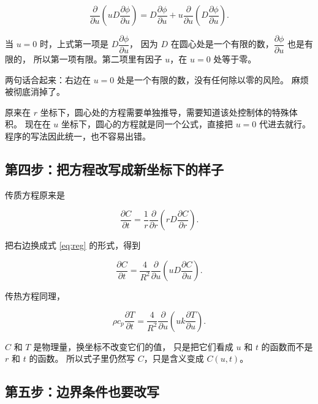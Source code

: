 \begin{equation}
\frac{\partial}{\partial u}\left(uD\frac{\partial\phi}{\partial u}\right)
= D\frac{\partial\phi}{\partial u} + u\frac{\partial}{\partial u}\left(D\frac{\partial\phi}{\partial u}\right).
\label{eq:expand-reg}
\end{equation}

当 $u=0$ 时，上式第一项是 $D\dfrac{\partial\phi}{\partial u}$，
因为 $D$ 在圆心处是一个有限的数，$\dfrac{\partial\phi}{\partial u}$ 也是有限的，
所以第一项有限。第二项里有因子 $u$，在 $u=0$ 处等于零。

两句话合起来：右边在 $u=0$ 处是一个有限的数，没有任何除以零的风险。
麻烦被彻底消掉了。

原来在 $r$ 坐标下，圆心处的方程需要单独推导，需要知道该处控制体的特殊体积。
现在在 $u$ 坐标下，圆心的方程就是同一个公式，直接把 $u=0$ 代进去就行。
程序的写法因此统一，也不容易出错。

\subsection{第四步：把方程改写成新坐标下的样子}

传质方程原来是

\begin{equation}
\frac{\partial C}{\partial t}=\frac{1}{r}\frac{\partial}{\partial r}\left(rD\frac{\partial C}{\partial r}\right).
\end{equation}

把右边换成式 \eqref{eq:reg} 的形式，得到

\begin{equation}
\boxed{\;
\frac{\partial C}{\partial t}=\frac{4}{R^2}\frac{\partial}{\partial u}\left(uD\frac{\partial C}{\partial u}\right).
\;}
\label{eq:mass-u}
\end{equation}

传热方程同理，

\begin{equation}
\boxed{\;
\rho c_p\frac{\partial T}{\partial t}=\frac{4}{R^2}\frac{\partial}{\partial u}\left(uk\frac{\partial T}{\partial u}\right).
\;}
\label{eq:energy-u}
\end{equation}

$C$ 和 $T$ 是物理量，换坐标不改变它们的值，
只是把它们看成 $u$ 和 $t$ 的函数而不是 $r$ 和 $t$ 的函数。
所以式子里仍然写 $C$，只是含义变成 $C(u,t)$。

\subsection{第五步：边界条件也要改写}

